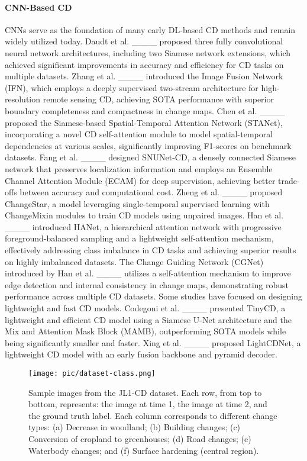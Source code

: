 \paragraph{CNN-Based CD}  
CNNs serve as the foundation of many early DL-based CD methods and remain widely utilized today.
Daudt et al. ____ proposed three fully convolutional neural network architectures, including two Siamese network extensions, which achieved significant improvements in accuracy and efficiency for CD tasks on multiple datasets.
Zhang et al. ____ introduced the Image Fusion Network (IFN), which employs a deeply supervised two-stream architecture for high-resolution remote sensing CD, achieving SOTA performance with superior boundary completeness and compactness in change maps.
Chen et al. ____ proposed the Siamese-based Spatial-Temporal Attention Network (STANet), incorporating a novel CD self-attention module to model spatial-temporal dependencies at various scales, significantly improving F1-scores on benchmark datasets.
Fang et al. ____ designed SNUNet-CD, a densely connected Siamese network that preserves localization information and employs an Ensemble Channel Attention Module (ECAM) for deep supervision, achieving better trade-offs between accuracy and computational cost.
Zheng et al. ____ proposed ChangeStar, a model leveraging single-temporal supervised learning with ChangeMixin modules to train CD models using unpaired images.
Han et al. ____ introduced HANet, a hierarchical attention network with progressive foreground-balanced sampling and a lightweight self-attention mechanism, effectively addressing class imbalance in CD tasks and achieving superior results on highly imbalanced datasets.
The Change Guiding Network (CGNet) introduced by Han et al. ____ utilizes a self-attention mechanism to improve edge detection and internal consistency in change maps, demonstrating robust performance across multiple CD datasets.
Some studies have focused on designing lightweight and fast CD models.
Codegoni et al. ____ presented TinyCD, a lightweight and efficient CD model using a Siamese U-Net architecture and the Mix and Attention Mask Block (MAMB), outperforming SOTA models while being significantly smaller and faster.
Xing et al. ____ proposed LightCDNet, a lightweight CD model with an early fusion backbone and pyramid decoder.

\begin{figure*}[!t]
    \centering
    \texttt{[image: pic/dataset-class.png]}
    \caption{Sample images from the JL1-CD dataset. Each row, from top to bottom, represents: the image at time 1, the image at time 2, and the ground truth label. Each column corresponds to different change types: (a) Decrease in woodland; (b) Building changes; (c) Conversion of cropland to greenhouses; (d) Road changes; (e) Waterbody changes; and (f) Surface hardening (central region).}
    \label{fig:dataset-class}
\end{figure*}

